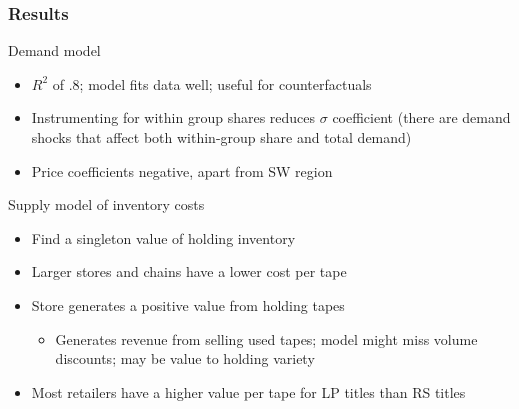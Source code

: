 
\begin{frame}
\frametitle{Results}

Demand model

\begin{itemize}
\item $R^2$ of .8; model fits data well; useful for counterfactuals

\item Instrumenting for within group shares reduces $\sigma$ coefficient
(there are demand shocks that affect both within-group share and total
demand)

\item Price coefficients negative, apart from SW region
\end{itemize}

Supply model of inventory costs

\begin{itemize}
\item Find a singleton value of holding inventory

\item Larger stores and chains have a lower cost per tape

\item Store generates a positive value from holding tapes

\begin{itemize}
\item Generates revenue from selling used tapes; model might miss volume
discounts; may be value to holding variety
\end{itemize}

\item Most retailers have a higher value per tape for LP titles than RS
titles
\end{itemize}
\end{frame}


